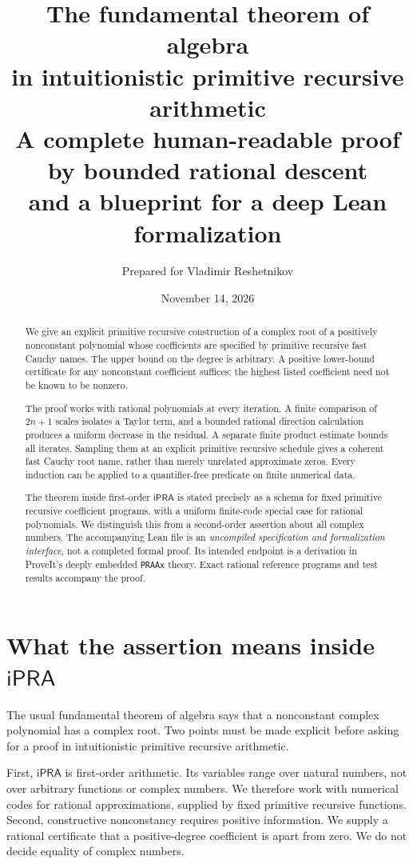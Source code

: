 \documentclass[11pt,letterpaper]{article}
\title{\textbf{The fundamental theorem of algebra\\in intuitionistic primitive recursive arithmetic}\\[5pt]
\large A complete human-readable proof by bounded rational descent\\and a blueprint for a deep Lean formalization}
\author{Prepared for Vladimir Reshetnikov}
\date{November 14, 2026}
\theoremstyle{definition}\newtheorem{definition}[theorem]{Definition}
\theoremstyle{remark}\newtheorem{remark}[theorem]{Remark}
\newcommand{\ipra}{\mathsf{iPRA}}
\begin{document}
\maketitle
\begin{abstract}
We give an explicit primitive recursive construction of a complex root of a
positively nonconstant polynomial whose coefficients are specified by primitive
recursive fast Cauchy names. The upper bound on the degree is arbitrary. A
positive lower-bound certificate for any nonconstant coefficient suffices;
the highest listed coefficient need not be known to be nonzero.

The proof works with rational polynomials at every iteration. A finite
comparison of $2n+1$ scales isolates a Taylor term, and a bounded rational
direction calculation produces a uniform decrease in the residual. A separate
finite product estimate bounds all iterates. Sampling them at an explicit
primitive recursive schedule gives a coherent fast Cauchy root name, rather
than merely unrelated approximate zeros. Every induction can be applied to
a quantifier-free predicate on finite numerical data.

The theorem inside first-order $\ipra$ is stated precisely as a schema for
fixed primitive recursive coefficient programs, with a uniform finite-code
special case for rational polynomials. We distinguish this from a second-order
assertion about all complex numbers. The accompanying Lean file is an
\emph{uncompiled specification and formalization interface}, not a completed
formal proof. Its intended endpoint is a derivation in ProveIt's deeply
embedded \texttt{PRAAx} theory. Exact rational reference programs and test
results accompany the proof.
\end{abstract}

\newpage
\tableofcontents
\newpage

\section{What the assertion means inside \texorpdfstring{$\ipra$}{iPRA}}
\label{sec:statement}

The usual fundamental theorem of algebra says that a nonconstant complex
polynomial has a complex root. Two points must be made explicit before asking
for a proof in intuitionistic primitive recursive arithmetic.

First, $\ipra$ is first-order arithmetic. Its variables range over natural
numbers, not over arbitrary functions or complex numbers. We therefore work
with numerical codes for rational approximations, supplied by fixed primitive
recursive functions. Second, constructive nonconstancy requires positive
information. We supply a rational certificate that a positive-degree
coefficient is apart from zero. We do not decide equality of complex numbers.
\end{document}
